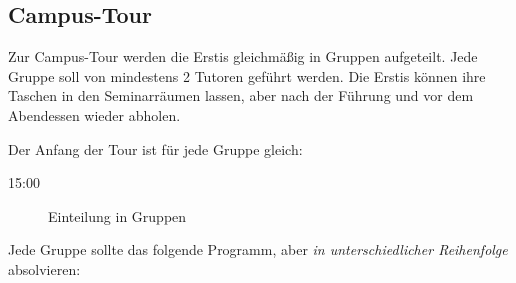 \documentclass[10pt,twocolumn,ngerman]{scrartcl}
\begin{document}
\subsection{Campus-Tour}

Zur Campus-Tour werden die Erstis gleichmäßig in Gruppen aufgeteilt.
Jede Gruppe soll von mindestens 2 Tutoren geführt werden. Die Erstis
können ihre Taschen in den Seminarräumen lassen, aber nach der Führung
und vor dem Abendessen wieder abholen.

Der Anfang der Tour ist für jede Gruppe gleich:
\begin{description}
\item [{15:00}] Einteilung in Gruppen\setlength{\itemsep}{0pt}
\end{description}
Jede Gruppe sollte das folgende Programm, aber \emph{in unterschiedlicher
Reihenfolge} absolvieren:
\end{document}
